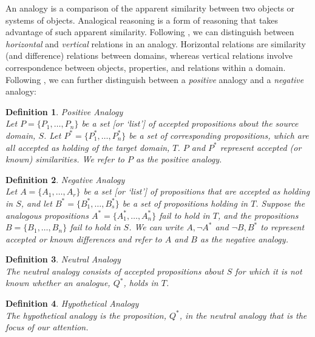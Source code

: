 \documentclass{amsart}
\theoremstyle{indented}
\newtheorem{definition}{Definition}[section]
\theoremstyle{indentedProp}
\theoremstyle{indented}
\theoremstyle{indented}
\theoremstyle{indented}
\theoremstyle{indented}
\theoremstyle{indented}
\begin{document}
An analogy is a comparison of the apparent similarity between two objects or systems of objects. Analogical reasoning is a form of reasoning that takes advantage of such apparent similarity. Following \citet{Hesse-1966}, we can distinguish between {\it horizontal} and {\it vertical} relations in an analogy. Horizontal relations are similarity (and difference) relations between domains, whereas vertical relations involve correspondence between objects, properties, and relations within a domain. Following \citet{Keynes-1921}, we can further distinguish between a {\it positive} analogy and a {\it negative} analogy: 
\begin{definition}\label{def:PositiveAnalogy}
{\it Positive Analogy}\\
Let $P = \{ P_1, \ldots , P_n \}$ be a set [or `list'] of accepted propositions about the source domain, $S$. Let $P^{*} = \{ P_{1}^{*}, \ldots , P_{n}^{*} \}$ be a set of corresponding propositions, which are all accepted as holding of the target domain, $T$. $P$ and $P^{*}$ represent accepted (or known) similarities. We refer to $P$ as the {\it positive analogy}.
\end{definition}
\begin{definition}\label{def:NegativeAnalogy}
{\it Negative Analogy}\\
Let $A = \{ A_1, \ldots, A_r \}$ be a set [or `list'] of propositions that are accepted as holding in $S$, and let $B^{*} = \{ B_{1}^{*}, \ldots , B_{s}^{*} \}$ be a set of propositions holding in $T$. Suppose the analogous propositions $A^{*} = \{ A_{1}^{*} , \ldots , A_{n}^{*} \}$ fail to hold in $T$, and the propositions $B = \{ B_1 , \ldots , B_n  \}$ fail to hold in $S$. We can write $A, \neg A^{*}$ and $\neg B, B^{*}$ to represent accepted or known differences and refer to $A$ and $B$ as the {\it negative analogy}.
\end{definition}
\begin{definition}\label{def:NeutralAnalogy}
{\it Neutral Analogy}\\
The {\it neutral analogy} consists of accepted propositions about $S$ for which it is not known whether an analogue, $Q^{*}$, holds in $T$.
\end{definition}
\begin{definition}\label{def:HypotheticalAnalogy}
{\it Hypothetical Analogy}\\
The {\it hypothetical analogy} is the proposition, $Q^{*}$, in the neutral analogy that is the focus of our attention.
\end{definition}
\end{document}
